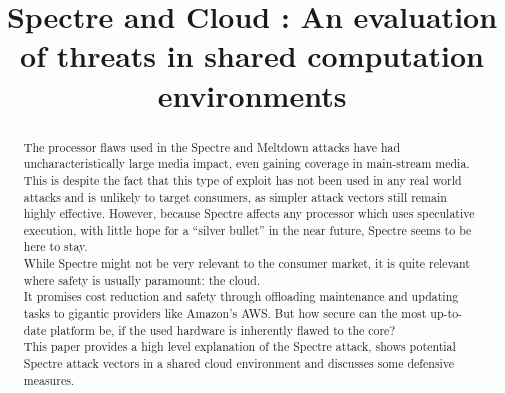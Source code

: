 \documentclass[conference,compsoc,final,a4paper]{IEEEtran}
\newcommand{\autoren}[0]{Mundhenke, Moritz}
\newcommand{\dokumententitel}[0]{Spectre and Cloud : An evaluation of threats in shared computation environments }
\begin{document}
\title{\dokumententitel}

\author{
  \IEEEauthorblockN{\autoren}
}

\maketitle
\thispagestyle{plain}
\pagestyle{plain}


\begin{abstract}
The processor flaws used in the Spectre and Meltdown attacks have had uncharacteristically large media impact, even gaining coverage in main-stream media. This is despite the fact that this type of exploit has not been used in any real world attacks and is unlikely to target consumers, as simpler attack vectors still remain highly effective. However, because Spectre affects any processor which uses speculative execution, with little hope for a \enquote{silver bullet} in the near future, Spectre seems to be here to stay. \\
While Spectre might not be very relevant to the consumer market, it is quite relevant where safety is usually paramount: the cloud. \\ 
It promises cost reduction and safety through offloading maintenance and updating tasks to gigantic providers like Amazon's \acs{AWS}. But how secure can the most up-to-date platform be, if the used hardware is inherently flawed to the core? \\
This paper provides a high level explanation of the Spectre attack, shows potential Spectre attack vectors in a shared cloud environment and discusses some defensive measures.
\end{abstract}

\tableofcontents

\end{document}
